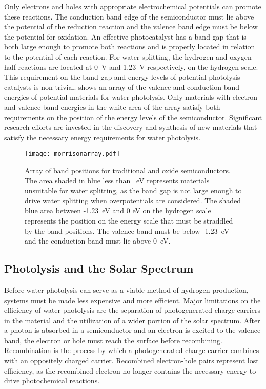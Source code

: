 Only electrons and holes with appropriate electrochemical potentials can 
promote these reactions. The conduction band edge of the semiconductor must 
lie above the potential of the reduction reaction and the valence band edge 
must be below the potential for oxidation. An effective photocatalyst has a 
band gap that is both large enough to promote both reactions and is 
properly located in relation to the potential of each reaction. For water 
splitting, the hydrogen and oxygen half reactions are located at 0~V and 
1.23~V respectively,\cite{noauthororeditor2007handbook} on the hydrogen 
scale. This requirement on the band gap and energy levels of potential 
photolysis catalysts is non-trivial.  shows an 
array of the valence and conduction band energies of potential materials 
for water photolysis.\cite{Morrison:1980va} Only materials with electron 
and valence band energies in the white area of the array satisfy both 
requirements on the position of the energy levels of the semiconductor. 
Significant research efforts\cite{Osterloh:2008fp} are invested in the 
discovery and synthesis of new materials that satisfy the necessary energy 
requirements for water photolysis. 

\begin{figure}
	\centering
	\texttt{[image: morrisonarray.pdf]}
	\caption[Array of band positions for semiconductors]{%
		Array of band positions for traditional and oxide semiconductors. 
		The area shaded in blue less than ~eV represents 
		materials unsuitable for water splitting, as the band gap is not 
		large enough to drive water splitting when overpotentials are 
		considered. The shaded blue area between -1.23~eV and 0 eV on the 
		hydrogen scale represents the position on the energy scale that 
		must be straddled by the band positions. The valence band must be 
		below -1.23~eV and the conduction band must lie above 
		0~eV.\cite{Morrison:1980va}}
	\label{fig:morrisonarray}
\end{figure}


\subsection{Photolysis and the Solar Spectrum}
\label{subsec:background.solarspectrum}


Before water photolysis can serve as a viable method of hydrogen 
production, systems must be made less expensive and more efficient. Major 
limitations on the efficiency of water photolysis are the separation of 
photogenerated charge carriers in the material and the utilization of a 
wider portion of the solar spectrum. After a photon is absorbed in a 
semiconductor and an electron is excited to the valence band, the electron 
or hole must reach the surface before recombining. Recombination is the 
process by which a photogenerated charge carrier combines with an 
oppositely charged carrier. Recombined electron-hole pairs represent lost 
efficiency, as the recombined electron no longer contains the necessary 
energy to drive photochemical reactions. 

